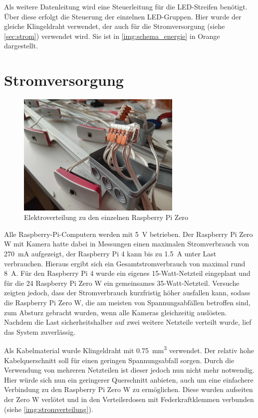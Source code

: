 \documentclass[./00PhotoBox.tex]{subfiles}
\begin{document}
Als weitere Datenleitung wird eine Steuerleitung für die LED-Streifen benötigt. Über diese erfolgt die Steuerung der einzelnen LED-Gruppen. Hier wurde der gleiche Klingeldraht verwendet, der auch für die Stromversorgung (siehe \autoref{sec:strom}) verwendet wird. Sie ist in \autoref{img:schema_energie} in Orange dargestellt.


\section{Stromversorgung}
\label{sec:strom}

\begin{figure}
    \centering
    \includegraphics[width=0.7\textwidth]{./img/3_aufbau/stromverteilung.jpg}
    \caption{Elektroverteilung zu den einzelnen Raspberry Pi Zero}
    \label{img:stromverteilung}
\end{figure}

Alle Raspberry-Pi-Computern werden mit \SI{5}{\volt} betrieben. Der Raspberry Pi Zero W mit Kamera hatte dabei in Messungen einen maximalen Stromverbrauch von \SI{270}{\milli\ampere} aufgezeigt, der Raspberry Pi 4 kann bis zu \SI{1,5}{\ampere} unter Last verbrauchen. Hieraus ergibt sich ein Gesamtstromverbrauch von maximal rund \SI{8}{\ampere}. Für den Raspberry Pi 4 wurde ein eigenes 15-Watt-Netzteil eingeplant und für die 24 Raspberry Pi Zero W ein gemeinsames 35-Watt-Netzteil. Versuche zeigten jedoch, dass der Stromverbrauch kurzfristig höher ausfallen kann, sodass die Raspberry Pi Zero W, die am meisten von Spannungsabfällen betroffen sind, zum Absturz gebracht wurden, wenn alle Kameras gleichzeitig auslösten. Nachdem die Last sicherheitshalber auf zwei weitere Netzteile verteilt wurde, lief das System zuverlässig.

Als Kabelmaterial wurde Klingeldraht mit \SI{0,75}{\cubic\milli\metre} verwendet. Der relativ hohe Kabelquerschnitt soll für einen geringen Spannungsabfall sorgen. Durch die Verwendung von mehreren Netzteilen ist dieser jedoch nun nicht mehr notwendig. Hier würde sich nun ein geringerer Querschnitt anbieten, auch um eine einfachere Verbindung zu den Raspberry Pi Zero W zu ermöglichen. Diese wurden aufseiten der Zero W verlötet und in den Verteilerdosen mit Federkraftklemmen verbunden (siehe \autoref{img:stromverteilung}).
\end{document}
